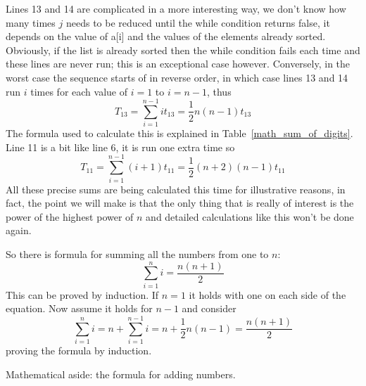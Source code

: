 \documentclass[11pt,a4paper]{scrartcl}
\begin{document}
Lines 13 and 14 are complicated in a more interesting way, we don't
know how many times $j$ needs to be reduced until the while condition
returns false, it depends on the value of a[i] and the values of the
elements already sorted. Obviously, if the list is already sorted then
the while condition fails each time and these lines are never run;
this is an exceptional case however. Conversely, in the worst case the
sequence starts of in reverse order, in which case lines 13 and 14 run
$i$ times for each value of $i=1$ to $i=n-1$, thus
\begin{equation}
T_{13}=\sum_{i=1}^{n-1}i t_{13}=\frac{1}{2}n(n-1) t_{13}
\end{equation}
The formula used to calculate this is explained in
Table~\ref{math_sum_of_digits}. Line 11 is a bit like line 6, it is
run one extra time so
\begin{equation}
T_{11}=\sum_{i=1}^{n-1}(i+1) t_{11}=\frac{1}{2}(n+2)(n-1) t_{11}
\end{equation}
All these precise sums are being calculated this time for illustrative
reasons, in fact, the point we will make is that the only thing that
is really of interest is the power of the highest power of $n$ and
detailed calculations like this won't be done again.

\begin{table}
So there is formula for summing all the numbers from one to $n$:
\begin{equation}
\sum_{i=1}^ni = \frac{n(n+1)}{2}
\end{equation}
This can be proved by induction. If $n=1$ it holds with one on each side of the equation. Now assume it holds for $n-1$ and consider
\begin{equation}
\sum_{i=1}^ni=n+\sum_{i=1}^{n-1}i=n+\frac{1}{2}n(n-1)=\frac{n(n+1)}{2}
\end{equation}
proving the formula by induction.
\caption{Mathematical aside: the formula for adding numbers. \label{math_sum_of_digits}}
\end{table}
\end{document}
